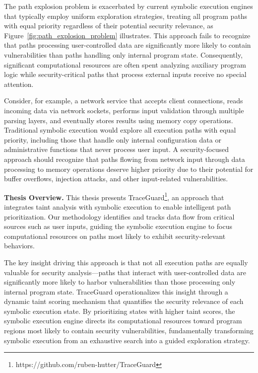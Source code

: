 The path explosion problem is exacerbated by current symbolic execution engines that typically employ uniform exploration strategies, treating all program paths with equal priority regardless of their potential security relevance, as Figure~\ref{fig:path_explosion_problem} illustrates. This approach fails to recognize that paths processing user-controlled data are significantly more likely to contain vulnerabilities than paths handling only internal program state. Consequently, significant computational resources are often spent analyzing auxiliary program logic while security-critical paths that process external inputs receive no special attention.

Consider, for example, a network service that accepts client connections, reads incoming data via network sockets, performs input validation through multiple parsing layers, and eventually stores results using memory copy operations. Traditional symbolic execution would explore all execution paths with equal priority, including those that handle only internal configuration data or administrative functions that never process user input. A security-focused approach should recognize that paths flowing from network input through data processing to memory operations deserve higher priority due to their potential for buffer overflows, injection attacks, and other input-related vulnerabilities.

\textbf{Thesis Overview.} This thesis presents TraceGuard\footnote{https://github.com/ruben-hutter/TraceGuard}, an approach that integrates taint analysis with symbolic execution to enable intelligent path prioritization. Our methodology identifies and tracks data flow from critical sources such as user inputs, guiding the symbolic execution engine to focus computational resources on paths most likely to exhibit security-relevant behaviors.

The key insight driving this approach is that not all execution paths are equally valuable for security analysis—paths that interact with user-controlled data are significantly more likely to harbor vulnerabilities than those processing only internal program state. TraceGuard operationalizes this insight through a dynamic taint scoring mechanism that quantifies the security relevance of each symbolic execution state. By prioritizing states with higher taint scores, the symbolic execution engine directs its computational resources toward program regions most likely to contain security vulnerabilities, fundamentally transforming symbolic execution from an exhaustive search into a guided exploration strategy.


